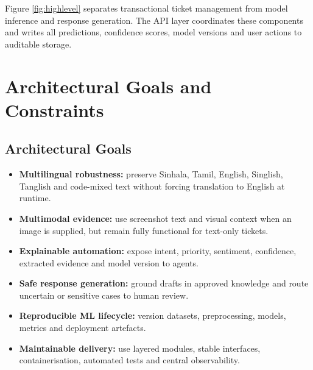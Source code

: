 \documentclass[10pt,letterpaper]{article}
\begin{document}
Figure \ref{fig:highlevel} separates transactional ticket management from model inference and response generation. The API layer coordinates these components and writes all predictions, confidence scores, model versions and user actions to auditable storage.

\section{Architectural Goals and Constraints}
\subsection*{Architectural Goals}
\begin{itemize}
  \item \textbf{Multilingual robustness:} preserve Sinhala, Tamil, English, Singlish, Tanglish and code-mixed text without forcing translation to English at runtime.
  \item \textbf{Multimodal evidence:} use screenshot text and visual context when an image is supplied, but remain fully functional for text-only tickets.
  \item \textbf{Explainable automation:} expose intent, priority, sentiment, confidence, extracted evidence and model version to agents.
  \item \textbf{Safe response generation:} ground drafts in approved knowledge and route uncertain or sensitive cases to human review.
  \item \textbf{Reproducible ML lifecycle:} version datasets, preprocessing, models, metrics and deployment artefacts.
  \item \textbf{Maintainable delivery:} use layered modules, stable interfaces, containerisation, automated tests and central observability.
\end{itemize}
\end{document}
